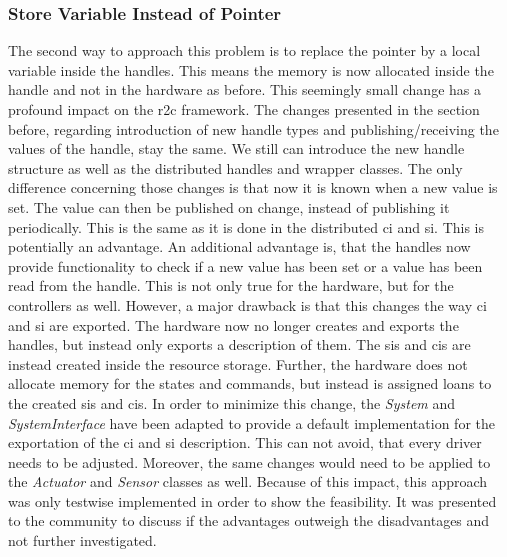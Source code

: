 \subsubsection*{Store Variable Instead of Pointer} 
The second way to approach this problem is to replace the pointer by a local variable inside the \glspl{handle}. This means the memory is now allocated inside the \gls{handle} and not in the hardware as before. This seemingly small change has a profound impact on the \gls{r2c} framework. The changes presented in the section before, regarding introduction of new \gls{handle} types and publishing/receiving the values of the \gls{handle}, stay the same. We still can introduce the new \gls{handle} structure as well as the distributed \glspl{handle} and wrapper classes. The only difference concerning those changes is that now it is known when a new value is set. The value can then be published on change, instead of publishing it periodically. This is the same as it is done in the distributed \gls{ci} and \gls{si}. This is potentially an advantage. An additional advantage is, that the \glspl{handle} now provide functionality to check if a new value has been set or a value has been read from the handle. This is not only true for the hardware, but for the controllers as well. \newline
However, a major drawback is that this changes the way \gls{ci} and \gls{si} are exported. The hardware now no longer creates and exports the \glspl{handle}, but instead only exports a description of them. The \glspl{si} and \glspl{ci} are instead created inside the resource storage. Further, the hardware does not allocate memory for the states and commands, but instead is assigned loans to the created \glspl{si} and \glspl{ci}. In order to minimize this change, the \textit{System} and \textit{SystemInterface} have been adapted to provide a default implementation for the exportation of the \gls{ci} and \gls{si} description. This can not avoid, that every driver needs to be adjusted. Moreover, the same changes would need to be applied to the \textit{Actuator} and \textit{Sensor} classes as well. Because of this impact, this approach was only testwise implemented in order to show the feasibility. It was presented to the community to discuss if the advantages outweigh the disadvantages and not further investigated.

